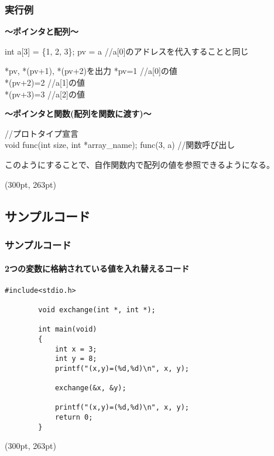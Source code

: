 \documentclass[dvipdfmx]{beamer}
\begin{document}
\begin{frame}[t, fragile]
    \frametitle{実行例}
    \textbf{～ポインタと配列～}
    \begin{block}{int a[3] = \{1, 2, 3\};}
        pv = a //a[0]のアドレスを代入することと同じ
    \end{block}
    \begin{block}{*pv, *(pv+1), *(pv+2)を出力}
        *pv=1       //a[0]の値\\
        *(pv+2)=2   //a[1]の値\\
        *(pv+3)=3   //a[2]の値
    \end{block}
    \textbf{～ポインタと関数(配列を関数に渡す)～}
    \begin{block}{//プロトタイプ宣言\\
        void func(int size, int *array\_name);}
        func(3, a) //関数呼び出し
    \end{block}
    このようにすることで、自作関数内で配列の値を参照できるようになる。
    \begin{textblock*}{0.3\linewidth}(300pt, 263pt)
        \space
    \end{textblock*}
\end{frame}

\subsection{サンプルコード}
\begin{frame}[t, fragile]
    \frametitle{サンプルコード}
    \framesubtitle{2つの変数に格納されている値を入れ替えるコード}
    \begin{lstlisting}[gobble=8, caption=pra\_pointer1.c]
        #include<stdio.h>

        void exchange(int *, int *);

        int main(void)
        {
            int x = 3;
            int y = 8;
            printf("(x,y)=(%d,%d)\n", x, y);

            exchange(&x, &y);
            
            printf("(x,y)=(%d,%d)\n", x, y);
            return 0;
        }
    \end{lstlisting}
    \begin{textblock*}{0.3\linewidth}(300pt, 263pt)
        \space
    \end{textblock*}
\end{frame}
\end{document}
